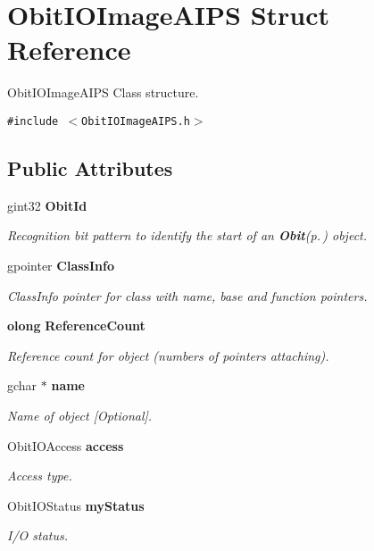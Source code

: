 \section{Obit\-IOImage\-AIPS Struct Reference}
\label{structObitIOImageAIPS}
Obit\-IOImage\-AIPS Class structure.  


{\tt \#include $<$Obit\-IOImage\-AIPS.h$>$}

\subsection*{Public Attributes}
\begin{CompactItemize}
\item 
gint32 {\bf Obit\-Id}
\begin{CompactList}\small\item\em Recognition bit pattern to identify the start of an {\bf Obit}{\rm (p.\,\pageref{structObit})} object. \item\end{CompactList}\item 
gpointer {\bf Class\-Info}
\begin{CompactList}\small\item\em Class\-Info pointer for class with name, base and function pointers. \item\end{CompactList}\item 
{\bf olong} {\bf Reference\-Count}
\begin{CompactList}\small\item\em Reference count for object (numbers of pointers attaching). \item\end{CompactList}\item 
gchar $\ast$ {\bf name}
\begin{CompactList}\small\item\em Name of object [Optional]. \item\end{CompactList}\item 
Obit\-IOAccess {\bf access}
\begin{CompactList}\small\item\em Access type. \item\end{CompactList}\item 
Obit\-IOStatus {\bf my\-Status}
\begin{CompactList}\small\item\em I/O status. \item\end{CompactList}\item 

\end{CompactItemize}
